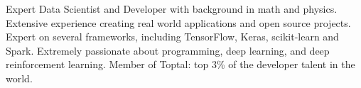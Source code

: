 \small{Expert Data Scientist and Developer with background in math and physics. Extensive experience creating real
world applications and open source projects. Expert on several frameworks, including TensorFlow, Keras, scikit-learn and Spark. Extremely
passionate about programming, deep learning, and deep reinforcement learning. Member of Toptal: top 3\% of
the developer talent in the world.}
